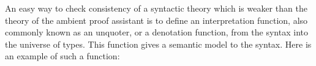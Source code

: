   An easy way to check consistency of a syntactic theory which is
  weaker than the theory of the ambient proof assistant is to define
  an interpretation function, also commonly known as an unquoter, or a
  denotation function, from the syntax into the universe of types.
  This function gives a semantic model to the syntax.  Here is an
  example of such a function:

\begin{code}%
\> \<%
\\
\>[0]\<[2]%
\>[2] \AgdaSymbol{:}   \<%
\\
\>[0]\<[2]%
\>[2]   \<[13]%
\>[13]\AgdaSymbol{=} \<%
\\
\>[0]\<[2]%
\>[2]     \AgdaSymbol{=}       \<%
\\
%
\\
\>[0]\<[2]%
\>[2] \AgdaSymbol{:}  \AgdaSymbol{\{}\AgdaSymbol{\}}\<%
\\
\>[2]\<[4]%
\>[4]        \<%
\\
\>[0]\<[2]%
\>[2]    \<[18]%
\>[18]\AgdaSymbol{=} \<%
\\
\>[0]\<[2]%
\>[2]    \<[18]%
\>[18]\AgdaSymbol{=} \<%
\\
\>[0]\<[2]%
\>[2]      \AgdaSymbol{=} \AgdaSymbol{(} \AgdaSymbol{:}    \AgdaSymbol{)}     \AgdaSymbol{(} \AgdaInductiveConstructor{,} \AgdaSymbol{)}\<%
\\
%
\\
\>[0]\<[2]%

\end{code}
